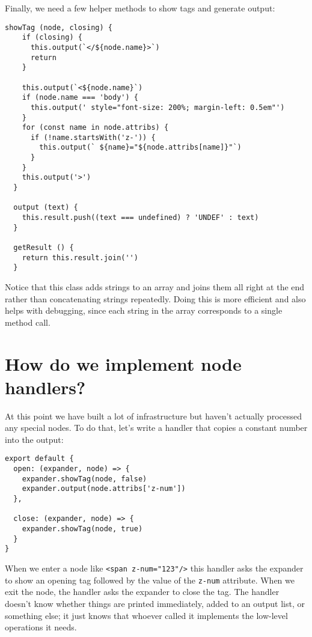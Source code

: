 \documentclass[krantzl]{krantz}
\begin{document}
Finally, we need a few helper methods to show tags and generate output:


\begin{lstlisting}[frame=tblr]
  showTag (node, closing) {
    if (closing) {
      this.output(`</${node.name}>`)
      return
    }

    this.output(`<${node.name}`)
    if (node.name === 'body') {
      this.output(' style="font-size: 200%; margin-left: 0.5em"')
    }
    for (const name in node.attribs) {
      if (!name.startsWith('z-')) {
        this.output(` ${name}="${node.attribs[name]}"`)
      }
    }
    this.output('>')
  }

  output (text) {
    this.result.push((text === undefined) ? 'UNDEF' : text)
  }

  getResult () {
    return this.result.join('')
  }
\end{lstlisting}



\noindent Notice that this class adds strings to an array and joins them all right at the end
rather than concatenating strings repeatedly.
Doing this is more efficient and also helps with debugging,
since each string in the array corresponds to a single method call.

\section{How do we implement node handlers?}\label{page-templates-handlers}


At this point
we have built a lot of infrastructure but haven’t actually processed any special nodes.
To do that,
let’s write a handler that copies a constant number into the output:


\begin{lstlisting}[frame=tblr]
export default {
  open: (expander, node) => {
    expander.showTag(node, false)
    expander.output(node.attribs['z-num'])
  },

  close: (expander, node) => {
    expander.showTag(node, true)
  }
}
\end{lstlisting}



\noindent When we enter a node like \texttt{<span z-num="123"/>}
this handler asks the expander to show an opening tag
followed by the value of the \texttt{z-num} attribute.
When we exit the node,
the handler asks the expander to close the tag.
The handler doesn’t know whether things are printed immediately,
added to an output list,
or something else;
it just knows that whoever called it implements the low-level operations it needs.
\end{document}
